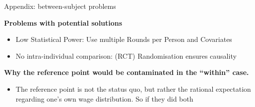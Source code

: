 \documentclass{beamer}
\begin{document}
\begin{frame}{Appendix: between-subject problems}

\textbf{Problems with potential solutions}
    \begin{itemize}
        \item Low Statistical Power: Use multiple Rounds per Person and Covariates
        \item No intra-individual comparison: (RCT) Randomisation ensures causality
    \end{itemize}

\textbf{Why the reference point would be contaminated in the “within” case.}
    \begin{itemize}
        \item The reference point is not the status quo, but rather the rational expectation regarding one’s own wage distribution. So if they did both 
    \end{itemize} 
    
\end{frame}
\end{document}
